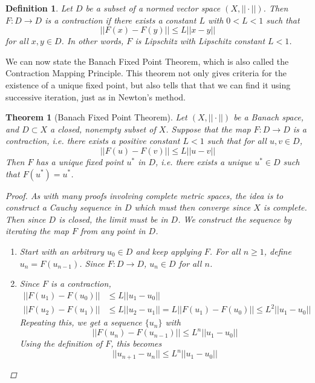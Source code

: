 \documentclass[12pt]{amsart}         %
\newtheorem{definition}{Definition}[section]
\newtheorem{theorem}{Theorem}[section]
\theoremstyle{remark}
\begin{document}
\begin{definition}Let $D$ be a subset of a normed vector space $(X, ||\cdot||)$. Then $F: D \rightarrow D$ is a \emph{contraction} if there exists a constant $L$ with $0 < L < 1$ such that 
\[
||F(x) - F(y)|| \leq L ||x - y||
\]
for all $x, y \in D$. In other words, $F$ is Lipschitz with Lipschitz constant $L < 1$.
\end{definition}

We can now state the Banach Fixed Point Theorem, which is also called the Contraction Mapping Principle. This theorem not only gives criteria for the existence of a unique fixed point, but also tells that that we can find it using successive iteration, just as in Newton's method. 

\begin{theorem}[Banach Fixed Point Theorem] Let $(X, ||\cdot||)$ be a Banach space, and $D \subset X$ a closed, nonempty subset of $X$. Suppose that the map $F: D \rightarrow D$ is a contraction, i.e. there exists a positive constant $L < 1$ such that for all $u, v \in D$,
\[
||F(u) - F(v)|| \leq L||u - v||
\]
Then $F$ has a unique fixed point $u^*$ in $D$, i.e. there exists a unique $u^* \in D$ such that $F(u^*) = u^*$.

\begin{proof}
As with many proofs involving complete metric spaces, the idea is to construct a Cauchy sequence in $D$ which must then converge since $X$ is complete. Then since $D$ is closed, the limit must be in $D$. We construct the sequence by iterating the map $F$ from any point in $D$.

\begin{enumerate}
	\item Start with an arbitrary $u_0 \in D$ and keep applying $F$. For all $n \geq 1$, define $u_n = F(u_{n-1})$. Since $F: D \rightarrow D$, $u_n \in D$ for all $n$.
	
	\item Since $F$ is a contraction,
	\begin{align*}
	||F(u_1) - F(u_0)|| &\leq L ||u_1 - u_0|| \\
	||F(u_2) - F(u_1)|| &\leq L ||u_2 - u_1|| = L||F(u_1) - F(u_0)|| \leq L^2 ||u_1 - u_0||
	\end{align*}
	Repeating this, we get a sequence $\{u_n\}$ with
	\[
	||F(u_n) - F(u_{n-1})|| \leq L^n ||u_1 - u_0||
	\]
	Using the definition of $F$, this becomes
	\[
	||u_{n+1} - u_n || \leq L^n ||u_1 - u_0||
	\]
	

\end{enumerate}
\end{proof}
\end{theorem}
\end{document}

